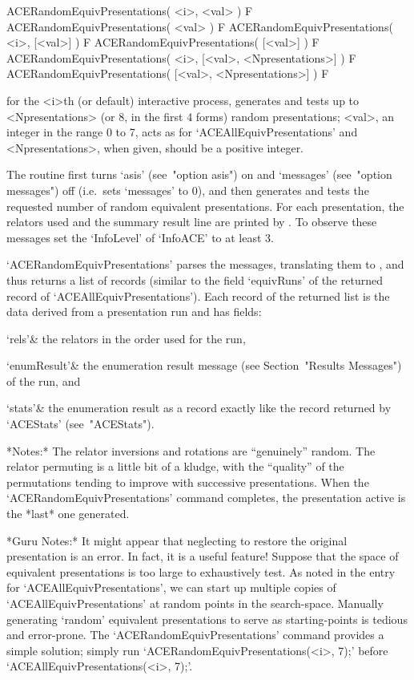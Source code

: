 \>ACERandomEquivPresentations( <i>, <val> ) F
\>ACERandomEquivPresentations( <val> ) F
\>ACERandomEquivPresentations( <i>, [<val>] ) F
\>ACERandomEquivPresentations( [<val>] ) F
\>ACERandomEquivPresentations( <i>, [<val>, <Npresentations>] ) F
\>ACERandomEquivPresentations( [<val>, <Npresentations>] ) F

for the <i>th (or default) interactive {\ACE} process,  generates  and
tests up to <Npresentations> (or 8,  in  the  first  4  forms)  random
presentations; <val>, an integer in the range 0  to  7,  acts  as  for
`ACEAllEquivPresentations' and <Npresentations>, when given, should be
a positive integer.

The routine first turns `asis' (see~"option asis") on  and  `messages'
(see~"option messages") off (i.e.~sets  `messages'  to  0),  and  then
generates  and  tests  the  requested  number  of  random   equivalent
presentations. For  each  presentation,  the  relators  used  and  the
summary result line are printed by {\ACE}. To observe  these  messages
set the `InfoLevel' of `InfoACE' to at least 3.

`ACERandomEquivPresentations' parses the {\ACE} messages,  translating
them to {\GAP}, and thus returns a list of  records  (similar  to  the
field     `equivRuns'     of     the      returned      record      of
`ACEAllEquivPresentations'). Each record of the returned list  is  the
data derived from a presentation run and has fields:

\beginitems

\quad`rels'& the relators in the order used for the run,

\quad`enumResult'&  the  {\ACE}  enumeration   result   message   (see
Section~"Results Messages") of the run, and

\quad`stats'& the enumeration result as a {\GAP} record  exactly  like
the record returned by `ACEStats' (see~"ACEStats").

\enditems

*Notes:*
The relator inversions and rotations  are  ``genuinely''  random.  The
relator permuting is a little bit of a kludge, with the ``quality'' of
the permutations tending to  improve  with  successive  presentations.
When  the   `ACERandomEquivPresentations'   command   completes,   the
presentation active is the *last* one generated.

*Guru Notes:*
It might appear that neglecting to restore the  original  presentation
is an error. In fact, it is a useful feature! Suppose that  the  space
of equivalent presentations is too  large  to  exhaustively  test.  As
noted in the entry for `ACEAllEquivPresentations',  we  can  start  up
multiple copies of `ACEAllEquivPresentations' at random points in  the
search-space. Manually generating `random' equivalent presentations to
serve   as   starting-points   is   tedious   and   error-prone.   The
`ACERandomEquivPresentations'  command  provides  a  simple  solution;
simply    run    `ACERandomEquivPresentations(<i>,     7);'     before
`ACEAllEquivPresentations(<i>, 7);'.

